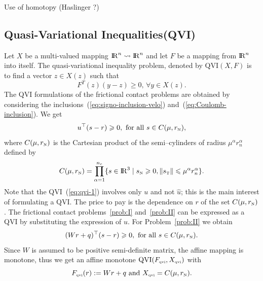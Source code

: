 \begin{ndrva}
  Use of homotopy (Haslinger ?)
\end{ndrva}

\subsection{Quasi-Variational Inequalities(QVI)}

Let $X$ be a multi-valued mapping  $\mathrm{I\!R}^{n} \rightsquigarrow  \mathrm{I\!R}^{n}$ and let  $F$ be a mapping from $\mathrm{I\!R}^n$ into itself. The  quasi-variational inequality  problem, denoted by $\mathrm{QVI}(X,F)$ is to find a vector $z\in X(z)$ such that 
\begin{equation}
 \label{eq:qvi}
 F^{T}(z) (y-z) \ge 0, \, \forall y \in X(z).
\end{equation}
The QVI formulations of the frictional contact problems are obtained by considering the inclusions~(\ref{eq:signo-inclusion-velo}) and~(\ref{eq:Coulomb-inclusion}). We get 
\begin{equation}
  \label{eq:qvi-1}
  u^\top (s - r) \geq 0, \text{ for all } s \in C(\mu, r_\n),
\end{equation}
where $C(\mu, r_{\hbox{\tiny{N}}})$ is the Cartesian product of the semi--cylinders of radius $\mu^\alpha r_n^\alpha$ defined by
\begin{equation}
  \label{eq:cylinder}
  C(\mu, r_\n) = \prod_{\alpha =1}^{n_c} \{ s \in \RR^3 \mid  s_\n \geq 0, \|s_\t\| \leq \mu^\alpha r^\alpha_n     \}.
\end{equation}
Note that the QVI~(\ref{eq:qvi-1}) involves only $u$ and not $\hat u$; this is the main interest of formulating a QVI. The price to pay is the dependence on $r$ of the set $C(\mu,r_{\hbox{\tiny{N}}})$. The frictional contact problems~\ref{prob:I} and~\ref{prob:II}  can be expressed as a QVI by substituting the expression of $u$. For Problem~\ref{prob:II} we obtain
\begin{equation}
  \label{eq:qvi-IIbis}
   (Wr+q)^\top (s - r) \geq 0, \text{ for all } s \in C(\mu,r_\n).
\end{equation}
Since $W$ is assumed to be positive semi-definite  matrix, the affine mapping is monotone, thus we get an affine monotone $\mathrm{QVI}(F_{{\hbox{\tiny{qvi}}}},X_{{\hbox{\tiny{qvi}}}})$ with
\begin{equation}
  \label{eq:qvi-II}
  F_{\qvitwo}(r) :=  Wr+q \text{ and } X_{\qvitwo} = C(\mu,r_\n) .
\end{equation}



